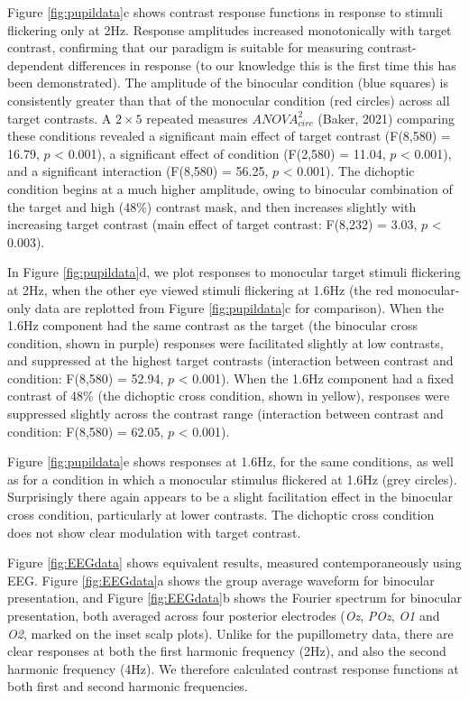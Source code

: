 \documentclass[
]{article}
\begin{document}
Figure \ref{fig:pupildata}c shows contrast response functions in response to stimuli flickering only at 2Hz. Response amplitudes increased monotonically with target contrast, confirming that our paradigm is suitable for measuring contrast-dependent differences in response (to our knowledge this is the first time this has been demonstrated). The amplitude of the binocular condition (blue squares) is consistently greater than that of the monocular condition (red circles) across all target contrasts. A \(2\times5\) repeated measures \(ANOVA^2_{circ}\) (Baker, 2021) comparing these conditions revealed a significant main effect of target contrast (F(8,580) = 16.79, \(p\) \textless{} 0.001), a significant effect of condition (F(2,580) = 11.04, \(p\) \textless{} 0.001), and a significant interaction (F(8,580) = 56.25, \(p\) \textless{} 0.001). The dichoptic condition begins at a much higher amplitude, owing to binocular combination of the target and high (48\%) contrast mask, and then increases slightly with increasing target contrast (main effect of target contrast: F(8,232) = 3.03, \(p\) \textless{} 0.003).

In Figure \ref{fig:pupildata}d, we plot responses to monocular target stimuli flickering at 2Hz, when the other eye viewed stimuli flickering at 1.6Hz (the red monocular-only data are replotted from Figure \ref{fig:pupildata}c for comparison). When the 1.6Hz component had the same contrast as the target (the binocular cross condition, shown in purple) responses were facilitated slightly at low contrasts, and suppressed at the highest target contrasts (interaction between contrast and condition: F(8,580) = 52.94, \(p\) \textless{} 0.001). When the 1.6Hz component had a fixed contrast of 48\% (the dichoptic cross condition, shown in yellow), responses were suppressed slightly across the contrast range (interaction between contrast and condition: F(8,580) = 62.05, \(p\) \textless{} 0.001).

Figure \ref{fig:pupildata}e shows responses at 1.6Hz, for the same conditions, as well as for a condition in which a monocular stimulus flickered at 1.6Hz (grey circles). Surprisingly there again appears to be a slight facilitation effect in the binocular cross condition, particularly at lower contrasts. The dichoptic cross condition does not show clear modulation with target contrast.

Figure \ref{fig:EEGdata} shows equivalent results, measured contemporaneously using EEG. Figure \ref{fig:EEGdata}a shows the group average waveform for binocular presentation, and Figure \ref{fig:EEGdata}b shows the Fourier spectrum for binocular presentation, both averaged across four posterior electrodes (\emph{Oz}, \emph{POz}, \emph{O1} and \emph{O2}, marked on the inset scalp plots). Unlike for the pupillometry data, there are clear responses at both the first harmonic frequency (2Hz), and also the second harmonic frequency (4Hz). We therefore calculated contrast response functions at both first and second harmonic frequencies.
\end{document}
